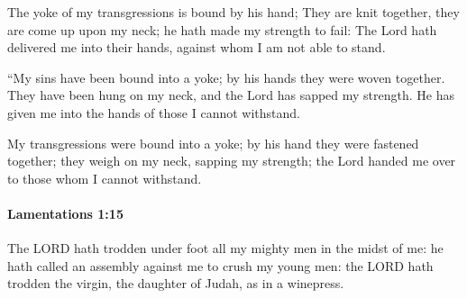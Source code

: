 			\begin{versebox}
					\item[BHS] 
					\item[LXX] 
					\item[ASV] The yoke of my transgressions is bound by his hand; They are knit together, they are come up upon my neck; he hath made my strength to fail: The Lord hath delivered me into their hands, against whom I am not able to stand.
					\item[NIV] “My sins have been bound into a yoke; by his hands they were woven together. They have been hung on my neck, and the Lord has sapped my strength. He has given me into the hands of those I cannot withstand.
					\item[NRSV] My transgressions were bound into a yoke; by his hand they were fastened together; they weigh on my neck, sapping my strength; the Lord handed me over to those whom I cannot withstand.
			\end{versebox}

		\paragraph{Lamentations 1:15} %
			\label{LAMENTATIONS-1-15}

			The LORD hath trodden under foot all my mighty men in the midst of me: he hath called an assembly against me to crush my young men: the LORD hath trodden the virgin, the daughter of Judah, as in a winepress.

